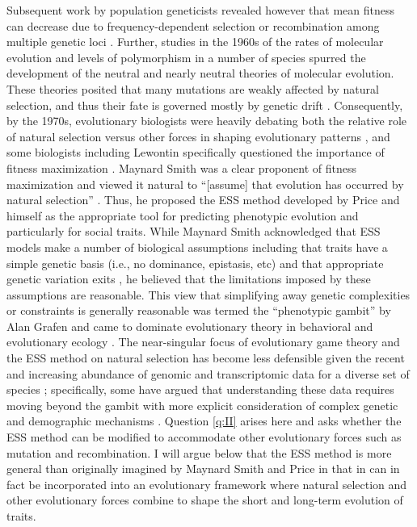 \documentclass[11pt]{article}
\begin{document}
Subsequent work by population geneticists revealed however that mean fitness can decrease due to frequency-dependent selection \cite{Wright:1955,Lewontin:1970} or recombination among multiple genetic loci \cite{Kojima:Kelleher:1961,Moran:1964,Karlin:1975,Akin:1979}. Further, studies in the 1960s of the rates of molecular evolution \cite{Zuckerkandl:Pauling:1965,King:Jukes:1969} and levels of polymorphism \cite{Harris:1966,Lewontin:Hubby:1966} in a number of species spurred the development of the neutral \cite{Kimura:1968,Kimura:1983:book} and nearly neutral \cite{Ohta:1974,Ohta:1992} theories \cite{Ohta:Gillespie:1996} of molecular evolution. These theories posited that many mutations are weakly affected by natural selection, and thus their fate is governed mostly by genetic drift \cite{Kimura:1983:book}. Consequently, by the 1970s, evolutionary biologists were heavily debating both the relative role of natural selection versus other forces in shaping evolutionary patterns \cite{Gillespie:Langley:1974,Gillespie:1978}, and some biologists including Lewontin specifically questioned the importance of fitness maximization \cite{Karlin:1975,Gould:Lewontin:1979}. Maynard Smith was a clear proponent of fitness maximization and viewed it natural to ``[assume] that evolution has occurred by natural selection'' \cite[p. 31]{MaynardSmith:1978}. Thus, he proposed the ESS method developed by Price and himself as the appropriate tool for predicting phenotypic evolution and particularly for social traits. While Maynard Smith acknowledged that ESS models make a number of biological assumptions including that traits have a simple genetic basis (i.e., no dominance, epistasis, etc) and that appropriate genetic variation exits \cite{MaynardSmith:1978}, he believed that the limitations imposed by these assumptions are reasonable. This view that simplifying away genetic complexities or constraints is generally reasonable was termed the ``phenotypic gambit'' by Alan Grafen \cite{Grafen:1984} and came to dominate evolutionary theory in behavioral and evolutionary ecology \cite{Houston:McNamara:1999}. The near-singular focus of evolutionary game theory and the ESS method on natural selection has become less defensible given the recent and increasing abundance of genomic and transcriptomic data for a diverse set of species \cite[e.g.,][]{Kapheim:Pan:2015,Mikheyev:Linksvayer:2015,Warner:Mikheyev:2017,Kocher:Mallarino:2018,Warner:Mikheyev:2019}; specifically, some have argued that understanding these data requires moving beyond the gambit with more explicit consideration of complex genetic and demographic mechanisms \cite[e.g.,][]{Springer:Crespi:2011,Rittschof:Robinson:2014,Akcay:Linksvayer:2015,Cunningham:2020}. Question \ref{q:II} arises here and asks whether the ESS method can be modified to accommodate other evolutionary forces such as mutation and recombination. I will argue below that the ESS method is more general than originally imagined by Maynard Smith and Price \cite{Maynard-Smith:Price:1973} in that in can in fact be incorporated into an evolutionary framework where natural selection and other evolutionary forces combine to shape the short and long-term evolution of traits.
\end{document}
